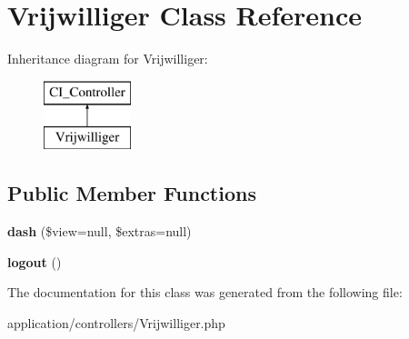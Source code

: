 \hypertarget{class_vrijwilliger}{}\section{Vrijwilliger Class Reference}
\label{class_vrijwilliger}
Inheritance diagram for Vrijwilliger\+:\begin{figure}[H]
\begin{center}
\leavevmode
\includegraphics[height=2.000000cm]{class_vrijwilliger}
\end{center}
\end{figure}
\subsection*{Public Member Functions}
\begin{DoxyCompactItemize}
\item 
\mbox{\label{class_vrijwilliger_a35f5125b52883ea70807c42282f60b54}} 
{\bfseries dash} (\$view=null, \$extras=null)
\item 
\mbox{\label{class_vrijwilliger_a082405d89acd6835c3a7c7a08a7adbab}} 
{\bfseries logout} ()
\end{DoxyCompactItemize}


The documentation for this class was generated from the following file\+:\begin{DoxyCompactItemize}
\item 
application/controllers/Vrijwilliger.\+php\end{DoxyCompactItemize}
